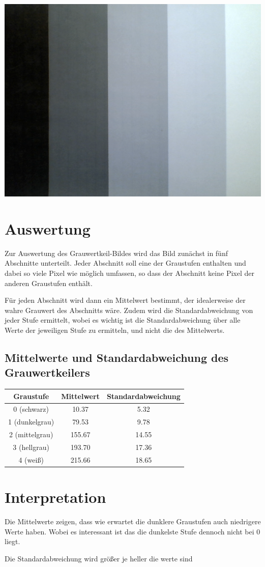 \includegraphics[scale=0.7]{media/grauwertkeil/grauwertkeil.png}
\label{Fig:Grawertkeil}


\section{Auswertung}
\label{chap:VERSUCH_1_AUSWERTUNG}

Zur Auswertung des Grauwertkeil-Bildes wird das Bild zunächst in fünf Abschnitte unterteilt. Jeder Abschnitt soll eine der Graustufen enthalten und dabei so viele Pixel wie möglich umfassen, so dass der Abschnitt keine Pixel der anderen Graustufen enthält.

Für jeden Abschnitt wird dann ein Mittelwert bestimmt, der idealerweise der wahre Grauwert des Abschnitts wäre.
Zudem wird die Standardabweichung von jeder Stufe ermittelt, wobei es wichtig ist die Standardabweichung über alle Werte der jeweiligen Stufe zu ermitteln, und nicht die des Mittelwerts.

\subsection*{Mittelwerte und Standardabweichung des Grauwertkeilers}

\begin{tabular}{|c|c|c|}
\hline 
Graustufe & Mittelwert & Standardabweichung \\ 
\hline 
0 (schwarz) & 10.37 & 5.32 \\ 
\hline 
1 (dunkelgrau) & 79.53 & 9.78 \\ 
\hline 
2 (mittelgrau) & 155.67 & 14.55 \\ 
\hline 
3 (hellgrau) & 193.70 & 17.36 \\ 
\hline 
4 (weiß) & 215.66 & 18.65 \\ 
\hline 
\end{tabular} 

\section{Interpretation}
\label{chap:VERSUCH_1_INTERPRETATION}

Die Mittelwerte zeigen, dass wie erwartet die dunklere Graustufen auch niedrigere Werte haben. Wobei es interessant ist das die dunkelste Stufe dennoch nicht bei 0 liegt.

Die Standardabweichung wird größer je heller die werte sind